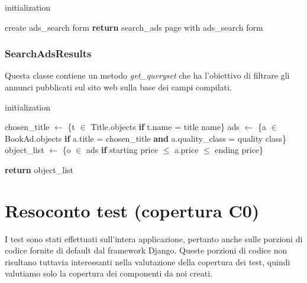 \documentclass[10pt,a4paper]{report}
\begin{document}
	\begin{algorithm}[H]
		initialization\;
		
		create ads\_search form\;
		\textbf{return} search\_ads page with ads\_search form\; 
	\end{algorithm}
	
	\subsubsection{SearchAdsResults}
	
	Questa classe contiene un metodo \textit{get\_queryset} che ha l'obiettivo di filtrare gli annunci pubblicati sul sito web sulla base dei campi compilati. \\
	
	\begin{algorithm}[H]
		initialization\;
		
		chosen\_title $\gets$ \{t $\in$ Title.objects \textbf{if} t.name = title name\}\;
		ads $\gets$ \{a $\in$ BookAd.objects \textbf{if} a.title = chosen\_title \textbf{and} a.quality\_class = quality class\}\;
		object\_list $\gets$ \{o $\in$ ads \textbf{if} starting price $\leq$ a.price $\leq$ ending price\}\;
		
		\textbf{return} object\_list\;
		
	\end{algorithm}

	\section{Resoconto test (copertura C0)}
	I test sono stati effettuati sull'intera applicazione, pertanto anche sulle porzioni di codice fornite di default dal framework Django. Queste porzioni di codice non risultano tuttavia interessanti nella valutazione della copertura dei test, quindi valutiamo solo la copertura dei componenti da noi creati.
	
\end{document}
